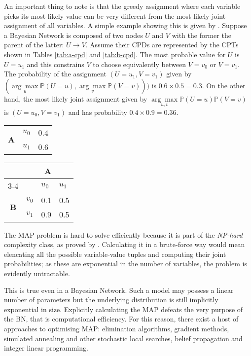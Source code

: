 An important thing to note is that the greedy assignment where each variable picks its most likely value can be very different from the most likely joint assignment of all variables.
A simple example showing this is given by \citet[pag. 26]{koller2007}.
Suppose a Bayesian Network is composed of two nodes $U$ and $V$ with the former the parent of the latter: $U \rightarrow V$.
Assume their CPDs are represented by the CPTs shown in Tables \ref{tab:a-cpd} and \ref{tab:b-cpd}.
The most probable value for $U$ is $U=u_1$ and this constrains $V$ to choose equivalently between $V=v_0$ or $V=v_1$.
The probability of the assignment $(U=u_1,V=v_1)$ given by $( \underset{u}{\arg\max} \mathbb{P}(U=u), \underset{v}{\arg\max} \mathbb{P}(V=v)) )$ is $0.6 \times 0.5 = 0.3$.
On the other hand, the most likely joint assignment given by $\underset{u,v}{\arg\max} \mathbb{P}(U=u)\mathbb{P}(V=v)$ is $(U=u_0,V=v_1)$ and has probability $0.4 \times 0.9 = 0.36$.

\begin{table*}[htbp]
\centering
\caption{U CPT}
\begin{tabularx}{\textwidth/4}{ccX}
\toprule
 \multirow{2}{*}{\textbf{A}} & $u_0$ & 0.4  \\
 & $u_1$ & 0.6 \\
\bottomrule
\end{tabularx}
\label{tab:a-cpd}
\end{table*}

\begin{table*}[htbp]
\centering
\caption{V CPT}
\begin{tabularx}{\textwidth/3}{ccXX}
\toprule
       &  \multicolumn{3}{c}{\textbf{A}} \\
\cmidrule(lr){3-4}
 & & $u_0$ & $u_1$   \\ 
 \multirow{2}{*}{\textbf{B}}  & $v_0$ & 0.1 & 0.5  \\
 & $v_1$ & 0.9 & 0.5    \\
\bottomrule
\end{tabularx}
\label{tab:b-cpd}
\end{table*}

The MAP problem is hard to solve efficiently because it is part of the \textit{NP-hard} complexity class, as proved by \citet{Shimony1994}.
Calculating it in a brute-force way would mean elencating all the possible variable-value tuples and computing their joint probabilities; as these are exponential in the number of variables, the problem is evidently untractable.

This is true even in a Bayesian Network.  
Such a model may possess a linear number of parameters but the underlying distribution is still implicitly exponential in size.
Explicitly calculating the MAP defeats the very purpose of the BN, that is computational efficiency.
For this reason, there exist a host of approaches to optimising MAP: elimination algorithms, gradient methods, simulated annealing and other stochastic local searches, belief propagation and integer linear programming.

